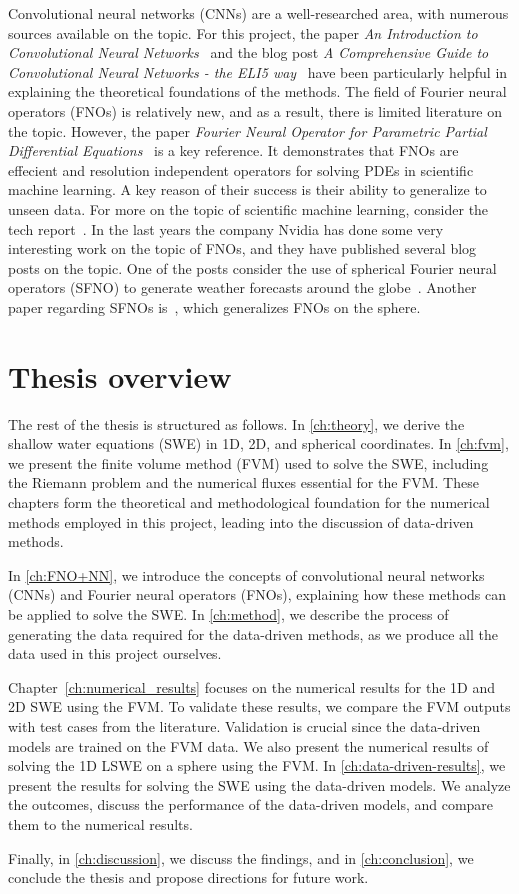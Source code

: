 Convolutional neural networks (CNNs) are a well-researched area, with numerous sources available on the topic.
For this project, the paper \textit{An Introduction to Convolutional Neural Networks}~\cite{oshea2015introductionconvolutionalneuralnetworks} and the blog post \textit{A Comprehensive Guide to Convolutional Neural Networks - the ELI5 way}~\cite{chollet2017comprehensive} have been particularly helpful in explaining the theoretical foundations of the methods.
The field of Fourier neural operators (FNOs) is relatively new, and as a result, there is limited literature on the topic.
However, the paper \textit{Fourier Neural Operator for Parametric Partial Differential Equations}~\cite{FNO_2021} is a key reference.
It demonstrates that FNOs are effecient and resolution independent operators for solving PDEs in scientific machine learning.
A key reason of their success is their ability to generalize to unseen data.
For more on the topic of scientific machine learning, consider the tech report~\cite{osti_1478744}.
In the last years the company Nvidia has done some very interesting work on the topic of FNOs, and they have published several blog posts on the topic.
One of the posts consider the use of spherical Fourier neural operators (SFNO) to generate weather forecasts around the globe~\cite{Nvidia2023}.
Another paper regarding SFNOs is~\cite{bonev2023-SFNO}, which generalizes FNOs on the sphere.

\newpage
\section{Thesis overview}
The rest of the thesis is structured as follows.
In \autoref{ch:theory}, we derive the shallow water equations (SWE) in 1D, 2D, and spherical coordinates.
In \autoref{ch:fvm}, we present the finite volume method (FVM) used to solve the SWE, including the Riemann problem and the numerical fluxes essential for the FVM.
These chapters form the theoretical and methodological foundation for the numerical methods employed in this project, leading into the discussion of data-driven methods.

In \autoref{ch:FNO+NN}, we introduce the concepts of convolutional neural networks (CNNs) and Fourier neural operators (FNOs), explaining how these methods can be applied to solve the SWE.
In \autoref{ch:method}, we describe the process of generating the data required for the data-driven methods, as we produce all the data used in this project ourselves.

Chapter~\ref{ch:numerical_results} focuses on the numerical results for the 1D and 2D SWE using the FVM.
To validate these results, we compare the FVM outputs with test cases from the literature. Validation is crucial since the data-driven models are trained on the FVM data.
We also present the numerical results of solving the 1D LSWE on a sphere using the FVM.
In \autoref{ch:data-driven-results}, we present the results for solving the SWE using the data-driven models.
We analyze the outcomes, discuss the performance of the data-driven models, and compare them to the numerical results.

Finally, in \autoref{ch:discussion}, we discuss the findings, and in \autoref{ch:conclusion}, we conclude the thesis and propose directions for future work.



